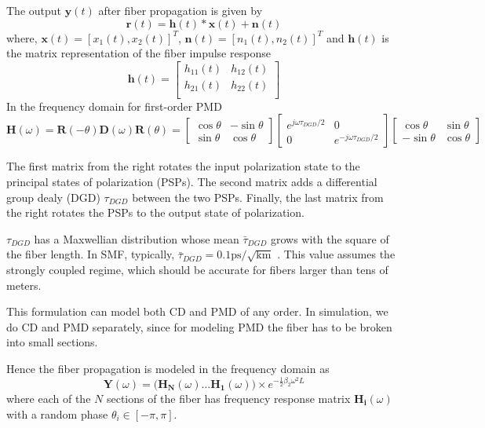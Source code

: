 \documentclass[a4paper]{article}
\begin{document}
The output $\bm{y}(t)$ after fiber propagation is given by
\begin{equation}
\bm{r}(t) = \bm{h}(t)\ast \bm{x}(t) + \bm{n}(t)
\end{equation}
where, $\bm{x}(t) = [x_1(t), x_2(t)]^T$, $\bm{n}(t) = [n_1(t), n_2(t)]^T$ and $\bm{h}(t)$ is the matrix representation of the fiber impulse response
\begin{equation}
\bm{h}(t) = \begin{bmatrix}
h_{11}(t) & h_{12}(t) \\
h_{21}(t) & h_{22}(t) \\
\end{bmatrix}
\end{equation}
In the frequency domain for first-order PMD
\begin{equation}
\bm{H}(\omega) = \bm{R}(-\theta)\bm{D}(\omega)\bm{R}(\theta)=\begin{bmatrix}
\cos\theta & -\sin\theta \\
\sin\theta & \cos\theta
\end{bmatrix}\begin{bmatrix}
e^{j\omega\tau_{DGD}/2} & 0 \\
0 & e^{-j\omega\tau_{DGD}/2}
\end{bmatrix}\begin{bmatrix}
\cos\theta & \sin\theta \\
-\sin\theta & \cos\theta
\end{bmatrix}
\end{equation}

The first matrix from the right rotates the input polarization state to the principal states of polarization (PSPs). The second matrix adds a differential group dealy (DGD) $\tau_{DGD}$ between the two PSPs. Finally, the last matrix from the right rotates the PSPs to the output state of polarization.

$\tau_{DGD}$ has a Maxwellian distribution whose mean $\bar{\tau}_{DGD}$ grows with the square of the fiber length. In SMF, typically, $\bar{\tau}_{DGD} = 0.1 \mathrm{ps/\sqrt{km}}$ \cite{Ip2008}. This value assumes the strongly coupled regime, which should be accurate for fibers larger than tens of meters.

This formulation can model both CD and PMD of any order. In simulation, we do CD and PMD separately, since for modeling PMD the fiber has to be broken into small sections.

Hence the fiber propagation is modeled in the frequency domain as
\begin{equation}
\bm{Y}(\omega) = \Big(\bm{H_N}(\omega)\ldots \bm{H_1}(\omega)\Big)\times e^{-\frac{1}{2}\beta_2\omega^2L}
\end{equation}
where each of the $N$ sections of the fiber has frequency response matrix $\bm{H_i}(\omega)$ with a random phase $\theta_i \in [-\pi, \pi]$.
\end{document}
